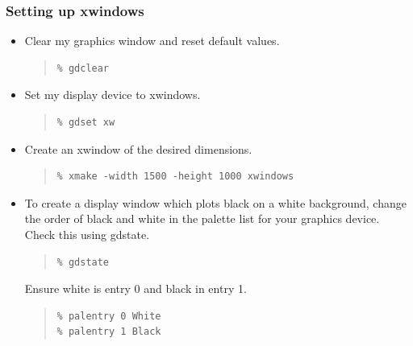 \documentclass[twoside,11pt]{article}
\newcommand{\xref}[3]{#1}
\renewcommand{\_}{\texttt{\symbol{95}}}
\newenvironment{myquote}{
   \color{MidnightBlue}\begin{quote}\begin{small}}{
   \end{small}\end{quote}
}
\newcommand{\task}[1]{\textsf{#1}}
\newcommand{\gdstate}{\xref{\task{gdstate}}{sun95}{GDSTATE}}
\renewenvironment{myquote}{
      \begin{quote}\begin{small}}{
      \end{small}\end{quote}
   }
\begin{document}
\subsubsection{Setting up xwindows}
\begin{itemize}
\item Clear my graphics window and reset default values.
\begin{myquote}
\begin{verbatim}
% gdclear
\end{verbatim}
\end{myquote}
\item Set my display device to xwindows.
\begin{myquote}
\begin{verbatim}
% gdset xw
\end{verbatim}
\end{myquote}
\item Create an xwindow of the desired dimensions.
\begin{myquote}
\begin{verbatim}
% xmake -width 1500 -height 1000 xwindows
\end{verbatim}
\end{myquote}
\item To create a display window which plots black on a white background, change the order of black and white in the palette list for your graphics device. Check this using \gdstate.
\begin{myquote}
\begin{verbatim}
% gdstate
\end{verbatim}
\end{myquote}
Ensure white is entry 0 and black in entry 1.
\begin{myquote}
\begin{verbatim}
% palentry 0 White
% palentry 1 Black
\end{verbatim}
\end{myquote}
\end{itemize}
\end{document}
